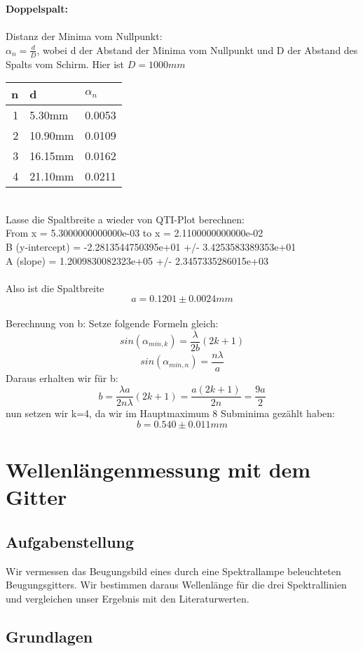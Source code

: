 \documentclass{article}
\begin{document}
\textbf{Doppelspalt:}\\
\\
Distanz der Minima vom Nullpunkt:\\
$\alpha_n=\frac{d}{D}$, wobei d der Abstand der Minima vom Nullpunkt und D der Abstand des Spalts vom Schirm. Hier ist $D=1000mm$\\
\begin{tabular}{|r|l|l|}
\hline
n & d & $\alpha_n$\\
\hline
1 & 5.30mm & 0.0053\\
2 & 10.90mm & 0.0109\\
3 & 16.15mm & 0.0162\\
4 & 21.10mm & 0.0211\\
\hline
\end{tabular}
\vspace{0.8cm}
\\Lasse die Spaltbreite a wieder von QTI-Plot berechnen:\\
From x = 5.3000000000000e-03 to x = 2.1100000000000e-02\\
B (y-intercept) = -2.2813544750395e+01 +/- 3.4253583389353e+01\\
A (slope) = 1.2009830082323e+05 +/- 2.3457335286015e+03\\
\\
Also ist die Spaltbreite
$$\boxed{a=0.1201 \pm 0.0024 mm}$$
\\
Berechnung von b: Setze folgende Formeln gleich:\\
$$sin(\alpha_{min,k})=\frac{\lambda}{2b}(2k+1)$$
$$sin(\alpha_{min,n})=\frac{n\lambda}{a}$$
Daraus erhalten wir für b:
$$b=\frac{\lambda a}{2n\lambda}(2k+1)=\frac{a(2k+1)}{2n}=\frac{9a}{2}$$
nun setzen wir k=4, da wir im Hauptmaximum 8 Subminima gezählt haben:
$$\boxed{b=0.540 \pm 0.011 mm}$$
\section{Wellenlängenmessung mit dem Gitter}

\subsection{Aufgabenstellung}
Wir vermessen das Beugungsbild eines durch eine Spektrallampe beleuchteten Beugungsgitters. Wir bestimmen daraus Wellenlänge für die drei Spektrallinien und vergleichen unser Ergebnis mit den Literaturwerten.
\subsection{Grundlagen}
\end{document}
